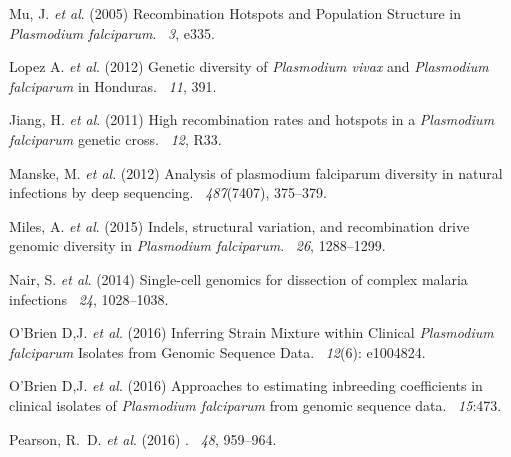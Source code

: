 \documentclass{article}
\begin{document}
\begin{thebibliography}{}
Mu, J. {\em et al}. (2005)
\newblock Recombination Hotspots and Population Structure in {\it Plasmodium falciparum}.
~{\em 3}, e335.


Lopez A. {\em et al}. (2012)
\newblock Genetic diversity of {\it Plasmodium vivax} and {\it Plasmodium falciparum} in Honduras.
~{\em 11}, 391.

Jiang, H. {\em et al}. (2011)
\newblock High recombination rates and hotspots in a {\it Plasmodium falciparum} genetic cross.
~{\em 12}, R33.

Manske, M. {\em et al}. (2012)
\newblock Analysis of plasmodium falciparum diversity in natural infections by
  deep sequencing.
~{\em 487\/}(7407), 375--379.

Miles, A. {\em et al}. (2015)
\newblock Indels, structural variation, and recombination drive genomic diversity in {\it Plasmodium falciparum}.
~{\em26\/}, 1288--1299.

Nair, S. {\em et al}. (2014)
\newblock Single-cell genomics for dissection of complex malaria infections
~{\em 24}, 1028--1038.


O'Brien D,J. {\em et al}. (2016)
\newblock Inferring Strain Mixture within Clinical {\em Plasmodium falciparum} Isolates from Genomic Sequence Data.
~{\em 12\/}(6): e1004824.

O'Brien D,J. {\em et al}. (2016)
\newblock Approaches to estimating inbreeding coefficients in clinical isolates of {\it Plasmodium falciparum} from genomic sequence data.
~{\em 15}:473.


Pearson, R.~D. {\em et al}. (2016)
.
~{\em 48}, 959--964.



\end{thebibliography}
\end{document}
